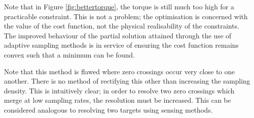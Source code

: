   Note that in Figure \ref{fig:bettertorque}, the torque is still much too high for a practicable constraint. This is not a problem; the optimisation is concerned with the value of the cost function, not the physical realisability of the constraints. The improved behaviour of the partial solution attained through the use of adaptive sampling methods is in service of ensuring the cost function remains convex such that a minimum can be found.
  
  Note that this method is flawed where zero crossings occur very close to one another. There is no method of rectifying this other than increasing the sampling density. This is intuitively clear; in order to resolve two zero crossings which merge at low sampling rates, the resolution must be increased. This can be considered analogous to resolving two targets using sensing methods.